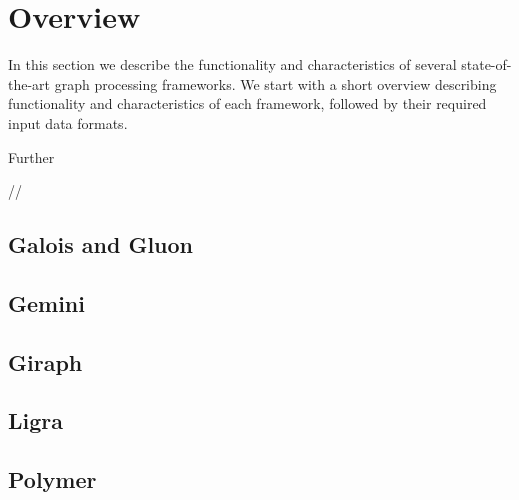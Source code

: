 
\section{Overview}
In this section we describe the functionality and characteristics of several state-of-the-art graph processing frameworks. 
We start with a short overview describing functionality and characteristics of each framework, followed by their required input data formats.

Further

//
\subsection{Galois and Gluon}


\subsection{Gemini}


\subsection{Giraph}


\subsection{Ligra}


\subsection{Polymer}





